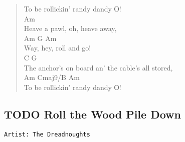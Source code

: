\documentclass[11pt]{article}
\begin{document}
\begin{verse}
To be rollickin' randy dandy О!\\
\vspace*{1em}
Am\\
Heave a pawl, oh, heave away,\\
Am   G    Am\\
Way, hey, roll and go!\\
\hspace*{4em}C                         G\\
The anchor's on board an' the cable's all stored,\\
\hspace*{8em}Am              Cmaj9/B  Am\\
To be rollickin' randy dandy О!\\
\end{verse}
\clearpage
\subsection{{\bfseries\sffamily TODO} Roll the Wood Pile Down}
\label{sec:org08e3cf6}
\begin{verbatim}
Artist: The Dreadnoughts
\end{verbatim}
\clearpage
\end{document}
